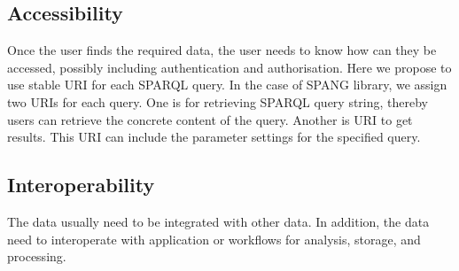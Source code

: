 \documentclass[runningheads]{llncs}
\begin{document}
\subsection{Accessibility}
Once the user finds the required data, the user needs to know how can they be accessed, possibly including authentication and authorisation.
Here we propose to use stable URI for each SPARQL query.
In the case of SPANG library, we assign two URIs for each query. 
One is for retrieving SPARQL query string, thereby users can retrieve the concrete content of the query. 
Another is URI to get results. This URI can include the parameter settings for the specified query.

\subsection{Interoperability}


The data usually need to be integrated with other data. 
In addition, the data need to interoperate with application or workflows for analysis, storage, and processing.
\end{document}

